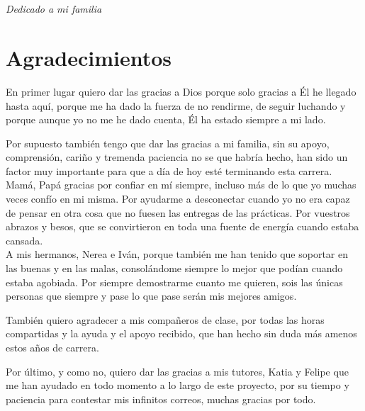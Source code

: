 \documentclass[a4paper, 12pt]{book}
\begin{document}
\chapter*{}
\begin{flushright}
\textit{Dedicado a mi familia \\
}
\end{flushright}


\chapter*{Agradecimientos}

En primer lugar quiero dar las gracias a Dios porque solo gracias a Él he llegado hasta aquí, porque me ha dado la fuerza de no rendirme, de seguir luchando y porque aunque yo no me he dado cuenta, Él ha estado siempre a mi lado.

Por supuesto también tengo que dar las gracias a mi familia, sin su apoyo, comprensión, cariño y tremenda paciencia no se que habría hecho, han sido un factor muy importante para que a día de hoy esté terminando esta carrera. Mamá, Papá gracias por confiar en mí siempre, incluso más de lo que yo muchas veces confío en mi misma. Por ayudarme a desconectar cuando yo no era capaz de pensar en otra cosa que no fuesen las entregas de las prácticas. Por vuestros abrazos y besos, que se convirtieron en toda una fuente de energía cuando estaba cansada. \\
A mis hermanos, Nerea e Iván, porque también me han tenido que soportar en las buenas y en las malas, consolándome siempre lo mejor que podían cuando estaba agobiada. Por siempre demostrarme cuanto me quieren, sois las únicas personas que siempre y pase lo que pase serán mis mejores amigos.

También quiero agradecer a mis compañeros de clase, por todas las horas compartidas y la ayuda y el apoyo recibido, que han hecho sin duda más amenos estos años de carrera.

Por último, y como no, quiero dar las gracias a mis tutores, Katia y Felipe que me han ayudado en todo momento a lo largo de este proyecto, por su tiempo y paciencia para contestar mis infinitos correos, muchas gracias por todo.
\end{document}
